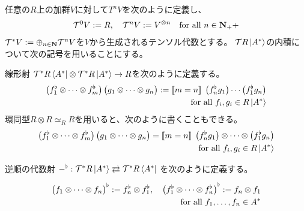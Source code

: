 {	任意の$R$上の加群$V$に対して$T^n V$を次のように定義し、
	\begin{equation*}\begin{split}
		{\ensuremath{{\mathcal{T}}}}^0 V := R ,\quad {\ensuremath{{\mathcal{T}}}}^n V := V^{\otimes n} 
		\quad\text{for all } n\in\mathbf{N}_++
	\end{split}\end{equation*}
	${{\mathcal{T}}}^*V:=\oplus_{n\in\mathbf{N}}{{\mathcal{T}}}^nV$を$V$から生成されるテンソル代数とする。
	${{\mathcal{T}}} R\mathinner{|{A^*}\rangle}$の内積について次の記号を用いることにする。
	\begin{description}\setlength{\itemsep}{-1mm} %
		\item[内積] 線形射
		${{\mathcal{T}}}^*R\mathinner{\langle{A^*}|}\otimes{\ensuremath{{\mathcal{T}}}}^*R\mathinner{|{A^*}\rangle}\to R$を次のように定義する。
		\begin{equation*}\begin{split}
			\mathinner{\bigl({f_1^\flat\otimes\cdots\otimes f_m^\flat}\bigr)}
			\mathinner{\bigl({g_1\otimes\cdots\otimes g_n}\bigr)}
			:= [\![m=n]\!]\;\mathinner{\bigl({f_n^\flat g_1}\bigr)}\cdots\mathinner{\bigl({f_1^\flat g_n}\bigr)} \\
			\quad\text{for all } f_i,g_i\in R\mathinner{|{A^*}\rangle}
		\end{split}\end{equation*}
		環同型$R\otimes R\simeq_R R$を用いると、次のように書くこともできる。
		\begin{equation*}\begin{split}
			\mathinner{\bigl({f_1^\flat\otimes\cdots\otimes f_m^\flat}\bigr)}
			\mathinner{\bigl({g_1\otimes\cdots\otimes g_n}\bigr)} = [\![m=n]\!]\;
			\mathinner{\bigl({f_n^\flat g_1}\bigr)}\otimes\cdots\otimes\mathinner{\bigl({f_1^\flat g_n}\bigr)} \\
			\quad\text{for all } f_i,g_i\in R\mathinner{|{A^*}\rangle}
		\end{split}\end{equation*}
		\item[転置] 逆順の代数射
		$-^\flat:\T^*R\ket{A^*}\xtofrom{}{}\T^*R\bra{A^*}$
		を次のように定義する。
		\begin{equation*}\begin{split}
			\mathinner{\bigl({f_1\otimes\cdots\otimes f_n}\bigr)}^\flat 
				:= f_n^\flat\otimes f_1^\flat
			,\quad \mathinner{\bigl({f_1^\flat\otimes\cdots\otimes f_n^\flat}\bigr)}^\flat 
				:= f_n\otimes f_1 \\
			\quad\text{for all } f_1,\dots,f_n\in A^*
		\end{split}\end{equation*}
	\end{description} %

}
